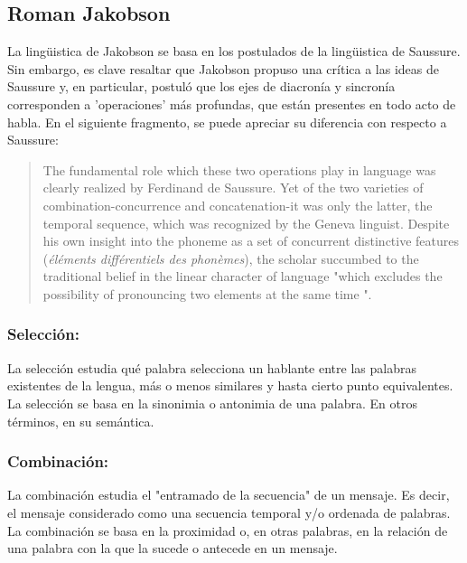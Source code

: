 \documentclass[12pt,letterpaper,twoside]{article}
\begin{document}
\subsection{Roman Jakobson}
\label{sec:org9941097}

La lingüistica de Jakobson se basa en los postulados de la lingüistica
de Saussure. Sin embargo, es clave resaltar que Jakobson propuso una crítica
a las ideas de Saussure y, en particular, postuló que los ejes de diacronía
y sincronía corresponden a 'operaciones' más profundas, que están presentes
en todo acto de habla. En el siguiente fragmento, se puede apreciar su
diferencia con respecto a Saussure:

\begin{quote}
The fundamental role which these two operations play in language
was clearly realized by Ferdinand de Saussure. Yet of the two
varieties of combination-concurrence and concatenation-it was only
the latter, the temporal sequence, which was recognized by the
Geneva linguist. Despite his own insight into the phoneme as a set
of concurrent distinctive features (\emph{éléments différentiels
des phonèmes}), the scholar succumbed to the traditional belief
in the linear character of language "which excludes the
possibility of pronouncing two elements at the same time ".
\cite[99]{jakobson1956two}
\end{quote}

\subsubsection{Selección:}
\label{sec:org7a08a3c}

La selección estudia qué palabra selecciona un hablante entre las
palabras existentes de la lengua, más o menos similares y hasta
cierto punto equivalentes. La selección se basa en la sinonimia o
antonimia de una palabra. En otros términos, en su semántica. \cite{jakobson1956two}


\subsubsection{Combinación:}
\label{sec:orgc7e5ab6}

La combinación estudia el "entramado de la secuencia" de un
mensaje. Es decir, el mensaje considerado como una secuencia
temporal y/o ordenada de palabras. La combinación se basa en la
proximidad o, en otras palabras, en la relación de una palabra con
la que la sucede o antecede en un mensaje. \cite{jakobson1956two}
\end{document}
